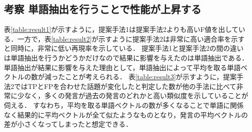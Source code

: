 \subsection*{考察 単語抽出を行うことで性能が上昇する}
表\ref{table:result1}が示すように，提案手法1は提案手法2よりも高いF値を出している．一方で，表\ref{table:result2}が示すように提案手法2は非常に高い適合率を示すと同時に，非常に低い再現率を示している．
提案手法1と提案手法2の間の違いは単語抽出を行うかどうかだけなので結果に影響を与えたのは単語抽出である．単語抽出が結果に影響を与えた理由として，単語抽出によって平均を取る単語ベクトルの数が減ったことが考えられる．
表\ref{table:result3}が示すように，提案手法2ではTPとFPを合わせた話題が変化したと判定した数が他の手法に比べて非常に少なく，多くの発言が過去の発言のどれかと高い類似度を示していることが伺える．
すなわち，平均を取る単語ベクトルの数が多くなることで単語に関係なく結果的に平均ベクトルが全て似たようなものとなり，発言の平均ベクトルの差が小さくなってしまったと想定できる．

